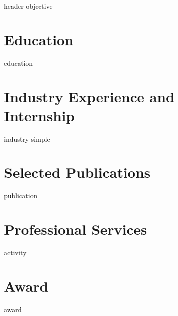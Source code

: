 \documentclass[letter,10pt]{article}
\begin{document}
{header}
{objective}

\section{Education}
{education}

\section{Industry Experience and Internship}
{industry-simple}


\section{Selected Publications}
{publication}



\section{Professional Services}
{activity}

\section{Award}
{award}
\end{document}
